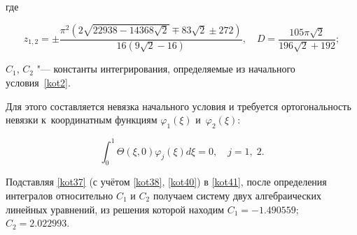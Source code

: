 где 

$$z_{1,2}=\pm\frac{\pi^2(2\sqrt{22938-14368\sqrt{2}}\mp83\sqrt{2}\pm272)}{16(9\sqrt{2}-16)},

\quad 

D=\frac{105\pi\sqrt{2}}{196\sqrt{2}+192};$$ 

$C_1$, $C_2$ "--- константы интегрирования, определяемые из начального условия~\eqref{kot2}.

Для этого составляется невязка начального условия и требуется ортогональность невязки к~координатным функциям $\varphi_1(\xi)$ и~$\varphi_2(\xi)$:

\begin{equation}

\label{kot41}

\int_0^1{\Theta(\xi, 0)\varphi_j(\xi)}d\xi=0, \quad j=1,\;2.

\end{equation}



Подставляя \eqref{kot37} (с учётом \eqref{kot38}, \eqref{kot40}) в \eqref{kot41}, после определения интегралов относительно $C_1$ и $C_2$ получаем систему двух алгебраических линейных уравнений, из решения которой находим $C_1=-1.490559$; $C_2=2.022993$.





\renewcommand{\baselinestretch}{0.9}



